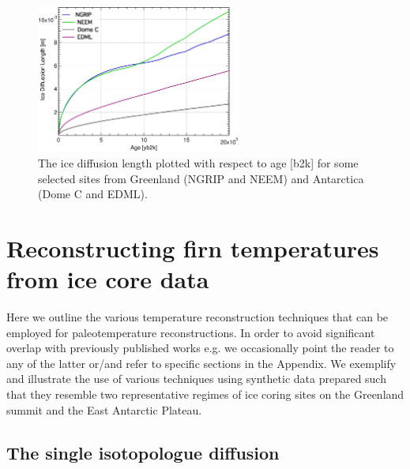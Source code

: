 \documentclass[11pt, draftcls, onecolumn]{IEEEtran} %
\numberwithin{equation}{section}
\numberwithin{table}{section}
\numberwithin{figure}{section}
\begin{document}
\begin{figure}[]
	\vspace*{2mm}
	\begin{center}
		\includegraphics[width=0.6\textwidth]{./Figure_2}
		\caption{The ice diffusion length plotted with respect to age [b2k]
			for some selected sites from Greenland (NGRIP and NEEM) and Antarctica (Dome C and EDML).} 
		\label{fig:ice_diffusion_multi}
	\end{center}
\end{figure}

\section{Reconstructing firn temperatures from ice core data}  \label{sec:methods}

Here we outline 
the various temperature reconstruction techniques that can be employed for 
paleotemperature reconstructions.
In order to avoid
significant overlap  with previously published works
e.g. \citet{Johnsen1977, Johnsen2000, Simonsen2011, Gkinis2014, vanderWel2015a} 
we occasionally  point the reader to any of the latter
or/and refer to specific sections in the Appendix.
We exemplify and illustrate the use of various techniques using synthetic data prepared such 
that they resemble  two representative regimes of ice coring sites on the Greenland summit and the 
East Antarctic Plateau. \\

\subsection{The single isotopologue diffusion}\label{sec:single_diffusion}
\end{document}
